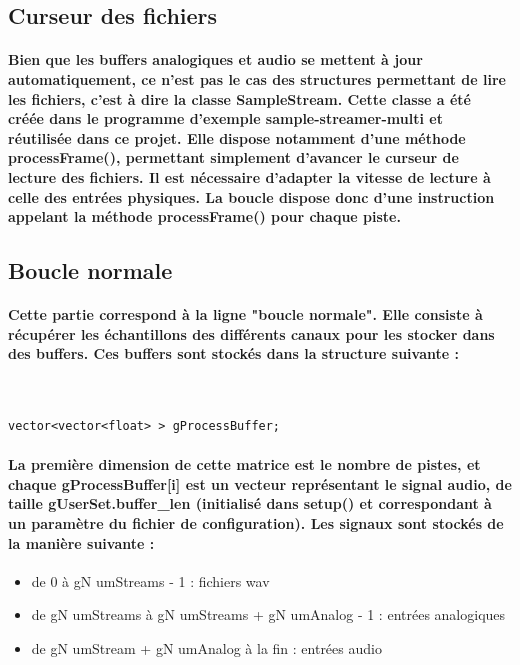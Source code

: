 \documentclass[a4paper]{article}
\begin{document}
\subsection{Curseur des fichiers} \paragraph{Bien que les buffers analogiques et
audio se mettent à jour automatiquement, ce n’est pas le cas des structures
permettant de lire les fichiers, c’est à dire la classe SampleStream. Cette
classe a été créée dans le programme d’exemple sample-streamer-multi et
réutilisée dans ce projet. Elle dispose notamment d’une méthode processFrame(),
permettant simplement d’avancer le curseur de lecture des fichiers. Il est
nécessaire d’adapter la vitesse de lecture à celle des entrées physiques. La
boucle dispose donc d’une instruction appelant la méthode processFrame() pour
chaque piste.}

\subsection{Boucle normale} \paragraph{Cette partie correspond à la ligne
"boucle normale". Elle consiste à récupérer les échantillons des différents
canaux pour les stocker dans des buffers. Ces buffers sont stockés dans la
structure suivante :} \

\begin{lstlisting}
vector<vector<float> > gProcessBuffer;
\end{lstlisting}

\paragraph{La première dimension de cette matrice est le nombre de pistes, et
chaque gProcessBuffer[i] est un vecteur représentant le signal audio, de taille
gUserSet.buffer\_len (initialisé dans setup() et correspondant à un paramètre du
fichier de configuration). Les signaux sont stockés de la manière suivante :}

\begin{itemize} \item de 0 à gN umStreams - 1 : fichiers wav \item de gN
umStreams à gN umStreams + gN umAnalog - 1 : entrées analogiques \item de gN
umStream + gN umAnalog à la fin : entrées audio \end{itemize}
\end{document}
